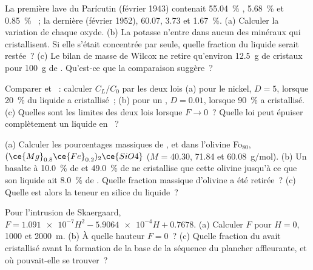 \begin{exercise}[$\star$]\label{exo:b2:magmatic-differentiation:4}
La première lave du Parícutin (février 1943) contenait \qty{55.04}{\percent} ,
\qty{5.68}{\percent}  et \qty{0.85}{\percent} ~; la dernière (février
1952), 60.07, 3.73 et \qty{1.67}{\percent}. (a) Calculer la variation de chaque oxyde.
(b) La potasse n'entre dans aucun des minéraux qui cristallisent. Si elle s'était concentrée par
 seule, quelle fraction du liquide serait restée~? (c) Le bilan de masse de Wilcox
ne retire qu'environ \qty{12.5}{g} de cristaux pour
\qty{100}{g} de . Qu'est-ce que la comparaison suggère~?
\end{exercise}

\begin{exercise}[$\star\star$]\label{exo:b2:magmatic-differentiation:5}
Comparer  et ~: calculer $C_L/C_0$ par les deux lois
(a) pour le nickel, $D = 5$, lorsque \qty{20}{\percent} du liquide a cristallisé~; (b)
pour un , $D = 0.01$, lorsque \qty{90}{\percent} a cristallisé.
(c) Quelles sont les limites des deux lois lorsque $F \to 0$~?
Quelle loi peut épuiser complètement un liquide en ~?
\end{exercise}

\begin{exercise}[$\star\star$]\label{exo:b2:magmatic-differentiation:6}
(a) Calculer les pourcentages massiques de ,  et  dans l'olivine
Fo$_{80}$, $(\ce{Mg}_{0.8}\ce{Fe}_{0.2})_2\ce{SiO4}$ ($M$ = 40.30, 71.84 et
\qty{60.08}{g/mol}). (b) Un basalte à \qty{10.0}{\percent} de  et
\qty{49.0}{\percent} de  ne cristallise que cette olivine jusqu'à ce que son liquide ait
\qty{8.0}{\percent} de . Quelle fraction massique d'olivine a été retirée~? (c) Quelle
est alors la teneur en silice du liquide~?
\end{exercise}

\begin{exercise}[$\star\star$]\label{exo:b2:magmatic-differentiation:7}
Pour l'intrusion de Skaergaard, $F = \num{1.091e-7}H^2 - \num{5.9064e-4}H + 0.7678$.
(a) Calculer $F$ pour $H = 0$, 1000 et \qty{2000}{m}. (b) À quelle hauteur $F = 0$~?
(c) Quelle fraction du  avait cristallisé avant la formation de la base de la séquence du plancher
affleurante, et où pouvait-elle se trouver~?
\end{exercise}

